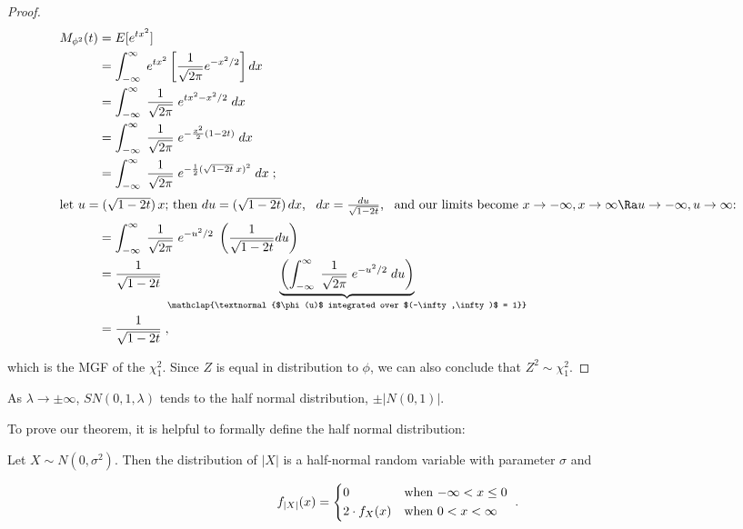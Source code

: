 \begin{proof}
  \begin{align*}
    M_{\phi^2}(t) &= E[e^{tx^2}] \\
    &= \int_{-\infty}^\infty \; e^{tx^2} \left[ \frac{1}{\sqrt{2\pi}} e^{-x^2/2} \right] dx \\
    &= \int_{-\infty}^\infty \; \frac{1}{\sqrt{2\pi}} \; e^{tx^2 - x^2/2} \; dx \\
    &= \int_{-\infty}^\infty \; \frac{1}{\sqrt{2\pi}} \; e^{-\frac{x^2}{2}(1 - 2t)} \; dx \\
    &= \int_{-\infty}^\infty \; \frac{1}{\sqrt{2\pi}} \; e^{-\frac{1}{2}(\sqrt{1-2t} \; x)^2} \; dx \;; \\
    \intertext{let $u = (\sqrt{1-2t}) \, x$; then $du = (\sqrt{1-2t}) \, dx$, \enspace $dx = \frac{du}{\sqrt{1-2t}}$, \enspace and our limits become $x \to -\infty, x \to \infty \Ra
      u \to -\infty, u \to \infty$:}
    &= \int_{-\infty}^\infty \; \frac{1}{\sqrt{2\pi}} \; e^{-u^2/2} \; \left( \frac{1}{\sqrt{1-2t}} du \right) \\
    &= \frac{1}{\sqrt{1-2t}} \; \underbrace{\left( \int_{-\infty}^\infty \; \frac{1}{\sqrt{2\pi}} \; e^{-u^2/2} \; du \right)}_{\mathclap{\textnormal{$\phi(u)$ integrated over
      $(-\infty,\infty)$ = 1}}} \label{phi-pdf} \\
    &= \frac{1}{\sqrt{1-2t}} \;,
  \end{align*}

  which is the MGF of the $\chi^2_1$. Since $Z$ is equal in distribution to
  $\phi$, we can also conclude that $Z^2 \sim \chi^2_1$. \end{proof}

\begin{property} \label{prop:3}
  As $\lambda \to \pm \infty$, \thinspace $SN(0,1,\lambda)$ tends to the half normal distribution, $\pm |N(0,1)|$.
\end{property}

To prove our theorem, it is helpful to formally define the half normal distribution:

\begin{helper-lem} \label{lem:p2-half-normal}
  Let $X \sim N(0, \sigma^2)$. Then the distribution of $|X|$ is a half-normal
  random variable with parameter $\sigma$ and

  \begin{equation*}
    f_{|X|}(x) =
    \begin{dcases*}
      0              & when $-\infty < x \leq 0$ \\
      2 \cdot f_X(x) & when $0 < x < \infty$ 
    \end{dcases*}
    .
  \end{equation*}
\end{helper-lem}

